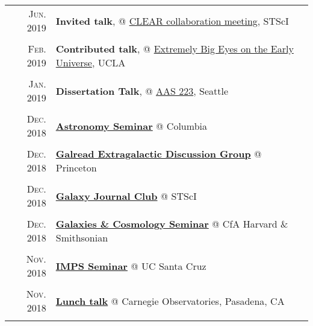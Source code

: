 \documentclass[letterpaper,10pt]{article}
\newcommand{\textwrap}{5.8in}       %
\begin{document}
\begin{longtable}{r|p{\textwrap}}
    \textsc{Jun. 2019}   &   \textbf{Invited talk}, @ \href{https://sites.google.com/view/clearhst19/home}{CLEAR collaboration meeting}, STScI \\
    \multicolumn{2}{c}{} \\

    \textsc{Feb. 2019}   &   \textbf{Contributed talk}, @ \href{https://conferences.pa.ucla.edu/early-universe-2019/agenda.html}{Extremely Big Eyes on the Early Universe}, UCLA  \\
    \multicolumn{2}{c}{} \\

    \textsc{Jan. 2019}   &   \textbf{Dissertation Talk}, @ \href{https://aas.org/meetings/aas233}{AAS 223}, Seattle    \\
    \multicolumn{2}{c}{} \\

    \textsc{Dec. 2018}   &   \href{http://www.astro.columbia.edu/event?eid=584}{\textbf{Astronomy Seminar}} @ Columbia \\
    \multicolumn{2}{c}{} \\

    \textsc{Dec. 2018}   &   \href{https://web.astro.princeton.edu/node/9886}{\textbf{Galread Extragalactic Discussion Group}} @ Princeton \\
    \multicolumn{2}{c}{} \\

    \textsc{Dec. 2018}   &   \href{https://sites.google.com/site/stscigalaxyclub/}{\textbf{Galaxy Journal Club}} @ STScI \\
    \multicolumn{2}{c}{} \\

    \textsc{Dec. 2018}   &   \href{https://www.cfa.harvard.edu/events/galaxies-cosmology-seminar?field_seminar_series_value=fall18}{\textbf{Galaxies \& Cosmology Seminar}} @ CfA Harvard \& Smithsonian \\
    \multicolumn{2}{c}{} \\

    \textsc{Nov. 2018}   &   \href{https://docs.google.com/document/d/1fhFuTsbHO7ATeQEiBvRQ4fj_BDR7pM4HPMjxeMyEyh4/edit}{\textbf{IMPS Seminar}} @ UC Santa Cruz \\
    \multicolumn{2}{c}{} \\

    \textsc{Nov. 2018}   &   \href{https://obs.carnegiescience.edu/content/tbd-108}{\textbf{Lunch talk}} @ Carnegie Observatories, Pasadena, CA \\
    \multicolumn{2}{c}{} \\


\end{longtable}
\end{document}
